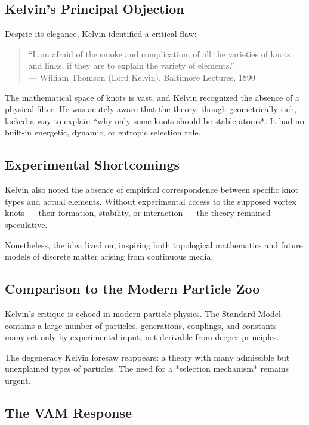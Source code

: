 \subsection*{Kelvin’s Principal Objection}

Despite its elegance, Kelvin identified a critical flaw:

\begin{quote}
 “I am afraid of the smoke and complication, of all the varieties of knots and links, if they are to explain the variety of elements.” \\
 — William Thomson (Lord Kelvin), Baltimore Lectures, 1890
\end{quote}

The mathematical space of knots is vast, and Kelvin recognized the absence of a physical filter. He was acutely aware that the theory, though geometrically rich, lacked a way to explain *why only some knots should be stable atoms*. It had no built-in energetic, dynamic, or entropic selection rule.

\subsection*{Experimental Shortcomings}

Kelvin also noted the absence of empirical correspondence between specific knot types and actual elements. Without experimental access to the supposed vortex knots — their formation, stability, or interaction — the theory remained speculative.

Nonetheless, the idea lived on, inspiring both topological mathematics and future models of discrete matter arising from continuous media.

\subsection*{Comparison to the Modern Particle Zoo}

Kelvin’s critique is echoed in modern particle physics. The Standard Model contains a large number of particles, generations, couplings, and constants — many set only by experimental input, not derivable from deeper principles.

The degeneracy Kelvin foresaw reappears: a theory with many admissible but unexplained types of particles. The need for a *selection mechanism* remains urgent.

\subsection*{The VAM Response}

